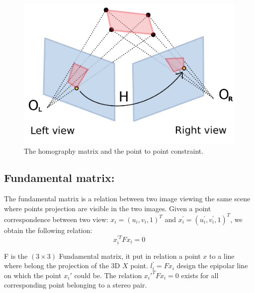 \documentclass[11pt, letterpaper]{report}
\begin{document}
\begin{itemize}
\begin{figure}[h!]
\begin{center}
\includegraphics[scale=.5]{figures/Homography_geometry}
\caption{The homography matrix and the point to point constraint.}
\end{center}
\end{figure}

\newpage
\subsection{Fundamental matrix:}
The fundamental matrix is a relation between two image viewing the same scene where points projection are visible in the two images. Given a point correspondence between two view: $x_i=(u_i,v_i,1)^T$ and $x_i^\prime=(u_i^\prime,v_i^\prime,1)^T$, we obtain the following relation:
\begin{equation}
x_i^{\prime T}F x_i=0
\end{equation}

F is the $(3\times3)$ Fundamental matrix, it put in relation a point $x$ to a line where belong the projection of the 3D $X$ point. $l_i^\prime=Fx_i$ design the epipolar line on which the point $x_i'$ could be. The relation $x_i'^TFx_i=0$ exists for all corresponding point belonging to a stereo pair.


\end{itemize}
\end{document}
